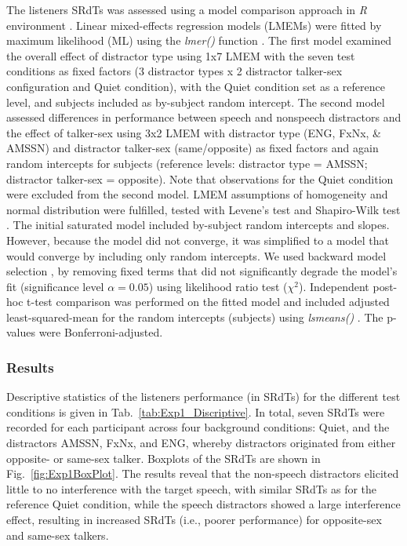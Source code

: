 \documentclass[a4paper, twoside]{templates/ociamthesis}
\begin{document}
\hfill\break
The listeners SRdTs was assessed using a model comparison approach in \emph{R} environment \autocite{RStudio}. Linear mixed-effects regression models (LMEMs) were fitted by maximum likelihood (ML) using the \textit{lmer()} function \autocite[\textit{lme4} package in][]{Bates2014}. The first model examined the overall effect of distractor type using 1x7 LMEM with the seven test conditions as fixed factors (3 distractor types x 2 distractor talker-sex configuration and Quiet condition), with the Quiet condition set as a reference level, and subjects included as by-subject random intercept. The second model assessed differences in performance between speech and nonspeech distractors and the effect of talker-sex using 3x2 LMEM with distractor type (ENG, FxNx, \& AMSSN) and distractor talker-sex (same/opposite) as fixed factors and again random intercepts for subjects (reference levels: distractor type = AMSSN; distractor talker-sex = opposite). Note that observations for the Quiet condition were excluded from the second model. LMEM assumptions of homogeneity and normal distribution were fulfilled, tested with Levene's test \autocite{Car_LevenTestRPackage} and Shapiro-Wilk test \autocite{Stats_ShapiroWilkRPackage}. The initial saturated model included by-subject random intercepts and slopes. However, because the model did not converge, it was simplified to a model that would converge by including only random intercepts. We used backward model selection \autocite[cf.][]{Barr2013}, by removing fixed terms that did not significantly degrade the model's fit (significance level \(\alpha =0.05\)) using likelihood ratio test (\(\chi^2\)). Independent post-hoc t-test comparison was performed on the fitted model and included adjusted least-squared-mean for the random intercepts (subjects) using \textit{lsmeans()} \autocite[lsmeans package;][]{Lenth2016}. The p-values were Bonferroni-adjusted.\\

\hypertarget{results}{%
\subsubsection{Results}\label{results}}

Descriptive statistics of the listeners performance (in SRdTs) for the different test conditions is given in Tab.~\ref{tab:Exp1_Discriptive}. In total, seven SRdTs were recorded for each participant across four background conditions: Quiet, and the distractors AMSSN, FxNx, and ENG, whereby distractors originated from either opposite- or same-sex talker. Boxplots of the SRdTs are shown in Fig.~\ref{fig:Exp1BoxPlot}. The results reveal that the non-speech distractors elicited little to no interference with the target speech, with similar SRdTs as for the reference Quiet condition, while the speech distractors showed a large interference effect, resulting in increased SRdTs (i.e., poorer performance) for opposite-sex and same-sex talkers.\\
\end{document}
